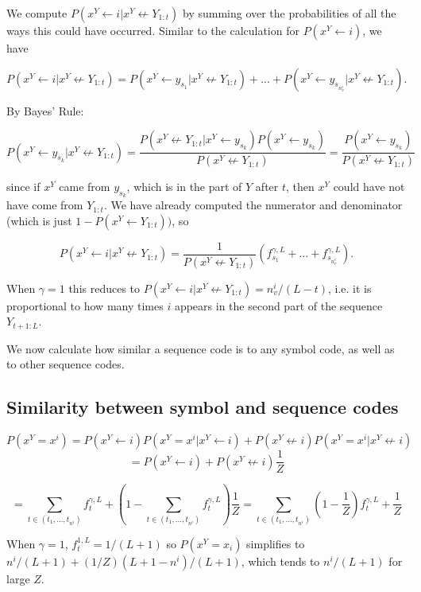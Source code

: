 \documentclass{article}
\begin{document}
\begin{appendices}
We compute $P(x^Y \leftarrow i|x^Y \not \leftarrow Y_{1:t})$ by summing over the probabilities of all the ways this could have occurred. Similar to the calculation for $P(x^Y \leftarrow i)$, we have

$$P(x^Y \leftarrow i|x^Y \not \leftarrow Y_{1:t}) = P(x^Y \leftarrow y_{s_1}| x^Y \not \leftarrow Y_{1:t}) + ... + P(x^Y \leftarrow y_{s_{n^i_v}}| x^Y \not \leftarrow Y_{1:t}).$$

By Bayes' Rule:

$$P(x^Y \leftarrow y_{s_k}| x^Y \not \leftarrow Y_{1:t}) = \frac{P(x^Y \not \leftarrow Y_{1:t}| x^Y \leftarrow y_{s_k})P(x^Y \leftarrow y_{s_k})}{P(x^Y \not\leftarrow Y_{1:t})} = \frac{P(x^Y \leftarrow y_{s_k})}{P(x^Y \not\leftarrow Y_{1:t})}$$

since if $x^Y$ came from $y_{s_k}$, which is in the part of $Y$ after $t$, then $x^Y$ could have not have come from $Y_{1:t}$. We have already computed the numerator and denominator (which is just $1 - P(x^Y \leftarrow Y_{1:t}))$, so

$$P(x^Y \leftarrow i|x^Y \not \leftarrow Y_{1:t}) = \frac{1}{P(x^Y \not\leftarrow Y_{1:t})}\left( f^{\gamma,L}_{s_1} + ... + f^{\gamma,L}_{s_{n^i_v}} \right).$$

When $\gamma = 1$ this reduces to $P(x^Y \leftarrow i|x^Y \not \leftarrow Y_{1:t}) = n^i_v/(L-t)$, i.e. it is proportional to how many times $i$ appears in the second part of the sequence $Y_{t+1:L}$.

We now calculate how similar a sequence code is to any symbol code, as well as to other sequence codes.

\subsection{Similarity between symbol and sequence codes}

$$P(x^Y = x^i) = P(x^Y \leftarrow i)P(x^Y = x^i|x^Y \leftarrow i) + P(x^Y \not \leftarrow i)P(x^Y = x^i|x^Y \not \leftarrow i)
$$
$$= P(x^Y \leftarrow i) + P(x^Y \not \leftarrow i)\frac{1}{Z}$$

$$= \sum\limits_{t \in (t_1, ..., t_{n^i})}f^{\gamma,L}_t + \left(1 - \sum\limits_{t \in (t_1, ..., t_{n^i})}f^{\gamma,L}_t\right)\frac{1}{Z}
= \sum\limits_{t \in (t_1, ..., t_{n^i})}\left(1 - \frac{1}{Z}\right)f^{\gamma,L}_t + \frac{1}{Z}$$

When $\gamma = 1$, $f_t^{1,L} = 1/(L+1)$ so $P(x^Y = x_i)$ simplifies to $n^i/(L+1) + (1/Z)(L+1-n^i)/(L+1)$, which tends to  $n^i/(L+1)$ for large $Z$.


\end{appendices}
\end{document}
